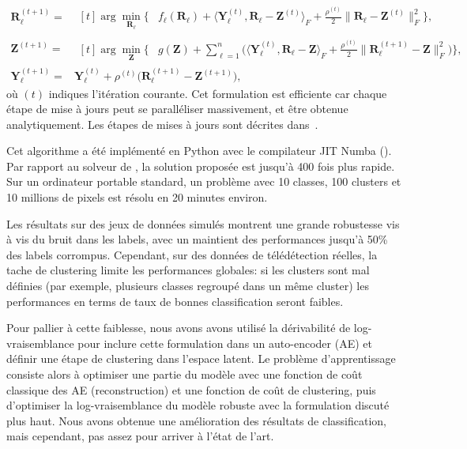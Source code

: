 \begin{align}
  \mathbf{R}_{\ell}^{(t+1)} = {} &  \begin{aligned}[t]
    \arg\min_{\mathbf{R}_\ell}\Bigg\{ & f_{\ell}(\mathbf{R}_\ell) + \langle\mathbf{Y}_\ell^{(t)}, \mathbf{R}_\ell - \mathbf{Z}^{(t)}\rangle_F  + \frac{\rho^{(t)}}{2}\|\mathbf{R}_\ell - \mathbf{Z}^{(t)}\|^2_F\Bigg\},
  \end{aligned}\label{eq:consensus:Rl}\\
  \mathbf{Z}^{(t+1)}  = { }&   \begin{aligned}[t]
    \arg\min_{\mathbf{Z}}\Bigg\{ & g(\mathbf{Z}) + \sum_{\ell=1}^{n} \bigg(\langle\mathbf{Y}_\ell^{(t)}, \mathbf{R}_\ell - \mathbf{Z}\rangle_F   + \frac{\rho^{(t)}}{2}\|\mathbf{R}_\ell^{(t+1)} - \mathbf{Z}\|^2_F\bigg)\Bigg\},
  \end{aligned}\label{eq:consensus:Z}\\
  \mathbf{Y}^{(t+1)}_\ell = {} &\mathbf{Y}^{(t)}_\ell + \rho^{(t)}\big(\mathbf{R}_\ell^{(t+1)}-\mathbf{Z}^{(t+1)}\big), \label{eq:consensus:Y}
\end{align}
où \((t)\) indiques l'itération courante. Cet formulation est efficiente car chaque étape de mise à jours peut se paralléliser massivement, et être obtenue analytiquement. Les étapes de mises à jours sont décrites dans~\cite{GIRYFOUQUET2021320}.

Cet algorithme a été implémenté en Python avec le compilateur JIT Numba (). Par rapport au solveur de \cite{bouveyron-2009-robus-super}, la solution proposée est jusqu'à 400 fois plus rapide. Sur un ordinateur portable standard, un problème avec 10 classes, 100 clusters et 10 millions de pixels est résolu en 20 minutes environ.

Les résultats sur des jeux de données simulés montrent une grande robustesse vis à vis du bruit dans les labels, avec un maintient des performances jusqu'à 50\% des labels corrompus. Cependant, sur des données de télédétection réelles, la tache de clustering limite les performances globales: si les clusters sont mal définies (par exemple, plusieurs classes regroupé dans un même cluster) les performances en terms de taux de bonnes classification seront faibles.

Pour pallier à cette faiblesse, nous avons avons utilisé la dérivabilité de log-vraisemblance pour inclure cette formulation dans un auto-encoder (AE) et définir une étape de clustering dans l'espace latent. Le problème d'apprentissage consiste alors à optimiser une partie du modèle avec une fonction de coût classique des AE (reconstruction) et une fonction de coût de clustering, puis d'optimiser la log-vraisemblance du modèle robuste avec la formulation discuté plus haut. Nous avons obtenue une amélioration des résultats de classification, mais cependant, pas assez pour arriver à l'état de l'art.

